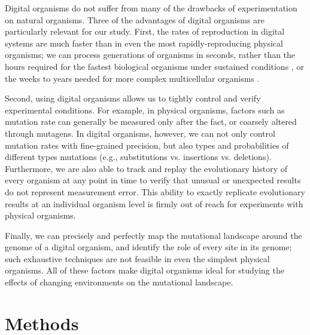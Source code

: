\documentclass[10pt,letterpaper,final]{article}
\begin{document}
Digital organisms do not suffer from many of the drawbacks of experimentation on natural organisms.  Three of the advantages of digital organisms are particularly relevant for our study.  First, the rates of reproduction in digital systems are much faster than in even the most rapidly-reproducing physical organisms; we can process generations of organisms in seconds, rather than the hours required for the fastest biological organisms under sustained conditions \cite{ryan_evolution_1953,lenski_long-term_1991}, or the weeks to years needed for more complex multicellular organisms \cite{anderson_outcrossing_2010,stearns_experimental_2000}.

Second, using digital organisms allows us to tightly control and verify experimental conditions. For example, in physical organisms, factors such as mutation rate can generally be measured only after the fact, or coarsely altered through mutagens. In digital organisms, however, we can not only control mutation rates with fine-grained precision, but also types and probabilities of different types mutations (e.g., substitutions vs. insertions vs. deletions). Furthermore, we are also able to track and replay the evolutionary history of every organism at any point in time to verify that unusual or unexpected results do not represent measurement error. This ability to exactly replicate evolutionary results at an individual organism level is firmly out of reach for experiments with physical organisms.

Finally, we can precisely and perfectly map the mutational landscape around the genome of a digital organism, and identify the role of every site in its genome\cite{ofria_evolution_2002}; such exhaustive techniques are not feasible in even the simplest physical organisms.  All of these factors make digital organisms ideal for studying the effects of changing environments on the mutational landscape.

\section*{Methods}
\end{document}
